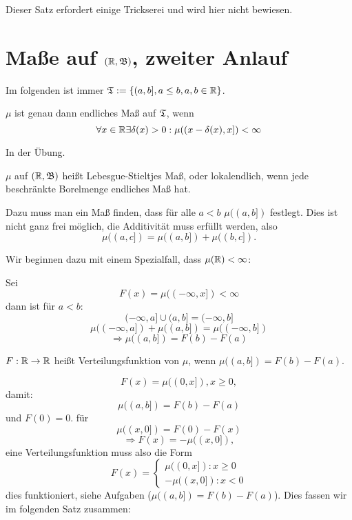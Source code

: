 			\begin{bew}
				Dieser Satz erfordert einige Trickserei und wird hier nicht bewiesen.
			\end{bew}
			
		\section{Maße auf $(\mathbb{R}, \mathfrak{B})$, zweiter Anlauf}
			Im folgenden ist immer $\mathfrak{T}:=\{(a,b], a\le b, a,b\in\mathbb{R}\}$.
			
			\begin{satz}
				$\mu$ ist genau dann endliches Maß auf $\mathfrak{T}$, wenn
				\[ \forall x\in\mathbb{R}\exists\delta(x)>0: \mu((x-\delta(x),x])<\infty \]
			\end{satz}	
			
			\begin{bew}
				In der Übung.
			\end{bew}
			
			\begin{defi}
				$\mu$ auf $(\mathbb{R}, \mathfrak{B})$ heißt Lebesgue-Stieltjes Maß, oder lokalendlich, wenn jede beschränkte Borelmenge endliches Maß hat. 
			\end{defi}
			
			\begin{bem}
				Dazu muss man ein Maß finden, dass für alle $a<b$ $\mu((a,b])$ festlegt. Dies ist nicht ganz frei möglich, die Additivität muss erfüllt werden, also 
				\[ \mu((a,c])=\mu((a,b])+\mu((b,c]). \]
				
				Wir beginnen dazu mit einem Spezialfall, dass $\mu(\mathbb{R})<\infty$:
			\end{bem}
			
			\begin{bsp}
				Sei
				\[ F(x)=\mu((-\infty,x])<\infty \]
				dann ist für $a<b$:
				\[ (-\infty,a]\cup (a,b]=(-\infty,b] \]
				\[ \mu((-\infty,a])+\mu((a,b])=\mu((-\infty,b]) \]
				\[ \Rightarrow \mu((a,b])=F(b)-F(a) \]
			\end{bsp} 
			
			\begin{defi}
				$F:\mathbb{R}\to\mathbb{R}$ heißt Verteilungsfunktion von $\mu$, wenn $\mu((a,b])=F(b)-F(a)$. 
			\end{defi}
			
			\begin{bem}
				\[ F(x)=\mu((0,x]), x\ge 0, \]
				damit:
				\[ \mu((a,b])=F(b)-F(a) \]
				und $F(0)=0$. \newline
				für
				\[ \mu((x,0])=F(0)-F(x) \]
				\[ \Rightarrow F(x)=-\mu((x,0]), \]
				eine Verteilungsfunktion muss also die Form
				\[ F(x)=\left\{\begin{array}{l}
				\mu((0,x]): x\ge 0\\
				-\mu((x,0]): x<0
				\end{array}\right. \]
				dies funktioniert, siehe Aufgaben (\zz $\mu((a,b])=F(b)-F(a)$). Dies fassen wir im folgenden Satz zusammen:
			\end{bem}
			
